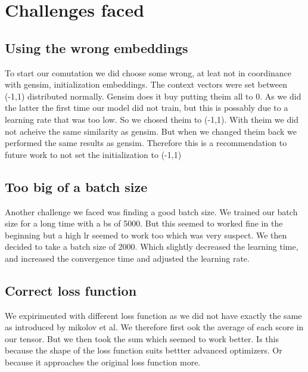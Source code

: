 \section{Challenges faced}
\subsection{Using the wrong embeddings}
To start our comutation we did choose some wrong, at leat not in coordinance with gensim, initialization embeddings. The context vectors were set between (-1,1) distributed normally. Gensim does it buy putting theim all to 0. As we did the latter the first time our model did not train, but this is possably due to a learning rate that was too low. So we chosed theim to (-1,1). With theim we did not acheive the same similarity as gensim. But when we changed theim back we performed the same results as gensim. Therefore this is a recommendation to future work to not set the initialization to (-1,1)
\subsection{Too big of a batch size}
Another challenge we faced was finding a good batch size. We trained our batch size for a long time with a bs of 5000. But this seemed to worked fine in the beginning but a high lr seemed to work too which was very suspect. We then decided to take a batch size of 2000. Which slightly decreased the learning time, and increased the convergence time and adjusted the learning rate. 
\subsection{Correct loss function}
We expirimented with different loss function as we did not have exactly the same as introduced by mikolov et al. We therefore first ook the average of each score in our tensor. But we then took the sum which seemed to work  better. Is this because the shape of the loss function suits bettter advanced optimizers. Or because it approaches the original loss function more. 


